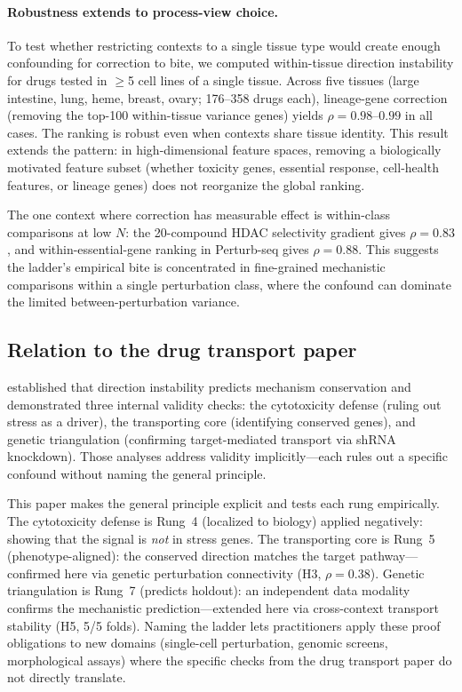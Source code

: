 \documentclass{article}
\begin{document}
\paragraph{Robustness extends to process-view choice.}
To test whether restricting contexts to a single tissue type would create
enough confounding for correction to bite, we computed within-tissue
direction instability for drugs tested in $\geq$5 cell lines of a single
tissue. Across five tissues (large intestine, lung, heme, breast, ovary;
176--358 drugs each), lineage-gene correction (removing the top-100
within-tissue variance genes) yields $\rho = 0.98$--$0.99$ in all cases.
The ranking is robust even when contexts share tissue identity. This
result extends the pattern: in high-dimensional feature spaces, removing
a biologically motivated feature subset (whether toxicity genes, essential
response, cell-health features, or lineage genes) does not reorganize the
global ranking.

The one context where correction has measurable effect is within-class
comparisons at low $N$: the 20-compound HDAC selectivity gradient gives
$\rho = 0.83$, and within-essential-gene ranking in Perturb-seq gives $\rho
= 0.88$. This suggests the ladder's empirical bite is concentrated in
fine-grained mechanistic comparisons within a single perturbation class,
where the confound can dominate the limited between-perturbation variance.

\subsection{Relation to the drug transport paper}

\citet{tower2026bracket} established that direction instability predicts mechanism
conservation and demonstrated three internal validity checks: the cytotoxicity
defense (ruling out stress as a driver), the transporting core (identifying
conserved genes), and genetic triangulation (confirming target-mediated
transport via shRNA knockdown). Those analyses address validity implicitly---each
rules out a specific confound without naming the general principle.

This paper makes the general principle explicit and tests each rung
empirically. The cytotoxicity defense is
Rung~4 (localized to biology) applied negatively: showing that the signal is
\emph{not} in stress genes. The transporting core is Rung~5 (phenotype-aligned):
the conserved direction matches the target pathway---confirmed here via
genetic perturbation connectivity (H3, $\rho = 0.38$). Genetic triangulation is
Rung~7 (predicts holdout): an independent data modality confirms the mechanistic
prediction---extended here via cross-context transport stability (H5, 5/5
folds). Naming the ladder lets practitioners apply these proof obligations
to new domains (single-cell perturbation, genomic screens, morphological
assays) where the specific checks from the drug transport paper do not
directly translate.
\end{document}
